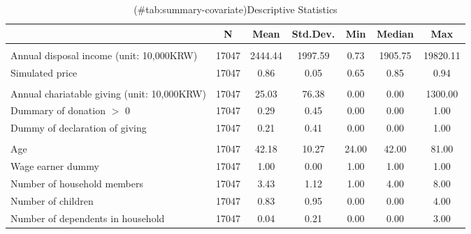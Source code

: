 \begin{table}

\caption{(\#tab:summary-covariate)Descriptive Statistics}
\centering
\fontsize{8}{10}\selectfont
\begin{threeparttable}
\begin{tabular}[t]{lcccccc}
\toprule
  & N & Mean & Std.Dev. & Min & Median & Max\\
\midrule
\addlinespace[0.3em]
\multicolumn{7}{l}{\textit{Income and giving price}}\\
\hspace{1em}Annual disposal income (unit: 10,000KRW) & 17047 & \num{2444.44} & \num{1997.59} & \num{0.73} & \num{1905.75} & \num{19820.11}\\
\hspace{1em}Simulated price & 17047 & \num{0.86} & \num{0.05} & \num{0.65} & \num{0.85} & \num{0.94}\\
\addlinespace[0.3em]
\multicolumn{7}{l}{\textit{Charitable giving}}\\
\hspace{1em}Annual chariatable giving (unit: 10,000KRW) & 17047 & \num{25.03} & \num{76.38} & \num{0.00} & \num{0.00} & \num{1300.00}\\
\hspace{1em}Dummary of donation $>$ 0 & 17047 & \num{0.29} & \num{0.45} & \num{0.00} & \num{0.00} & \num{1.00}\\
\hspace{1em}Dummy of declaration of giving & 17047 & \num{0.21} & \num{0.41} & \num{0.00} & \num{0.00} & \num{1.00}\\
\addlinespace[0.3em]
\multicolumn{7}{l}{\textit{Demographics}}\\
\hspace{1em}Age & 17047 & \num{42.18} & \num{10.27} & \num{24.00} & \num{42.00} & \num{81.00}\\
\hspace{1em}Wage earner dummy & 17047 & \num{1.00} & \num{0.00} & \num{1.00} & \num{1.00} & \num{1.00}\\
\hspace{1em}Number of household members & 17047 & \num{3.43} & \num{1.12} & \num{1.00} & \num{4.00} & \num{8.00}\\
\hspace{1em}Number of children & 17047 & \num{0.83} & \num{0.95} & \num{0.00} & \num{0.00} & \num{4.00}\\
\hspace{1em}Number of dependents in household & 17047 & \num{0.04} & \num{0.21} & \num{0.00} & \num{0.00} & \num{3.00}\\

\end{tabular}
\end{threeparttable}
\end{table}
